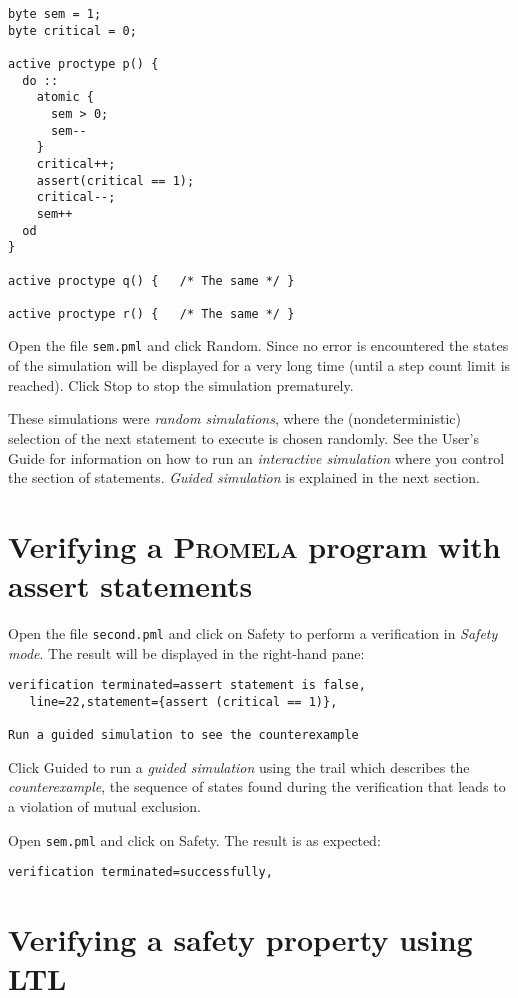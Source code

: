 \documentclass[11pt]{article}
\newcommand*{\prm}{\textsc{Promela}}
\newcommand*{\p}[1]{\texttt{#1}}
\newcommand*{\bu}[1]{\textsf{#1}}
\begin{document}
\pagebreak[4]

\begin{verbatim}
byte sem = 1;
byte critical = 0;

active proctype p() {	
  do :: 
    atomic {
      sem > 0;
      sem--
    }
    critical++;
    assert(critical == 1);
    critical--;
    sem++
  od
}

active proctype q() {	/* The same */ }

active proctype r() {	/* The same */ }	
\end{verbatim}

Open the file \p{sem.pml} and click \bu{Random}. Since no error is
encountered the states of the simulation will be displayed for a very
long time (until a step count limit is reached). Click \bu{Stop} to stop
the simulation prematurely.

These simulations were \emph{random simulations}, where the
(nondeterministic) selection of the next statement to execute is chosen
randomly. See the User's Guide for information on how to run an
\emph{interactive simulation} where you control the section of
statements. \emph{Guided simulation} is explained in the next section.

\section{Verifying a \prm{} program with assert statements}

Open the file \p{second.pml} and click on \bu{Safety} to perform a
verification in \emph{Safety mode}. The result will be displayed in the
right-hand pane:
\begin{verbatim}
verification terminated=assert statement is false,
   line=22,statement={assert (critical == 1)},

Run a guided simulation to see the counterexample
\end{verbatim}

Click \bu{Guided} to run a \emph{guided simulation} using the trail
which describes the \emph{counterexample}, the sequence of states found
during the verification that leads to a violation of mutual exclusion.

Open \p{sem.pml} and click on \bu{Safety}. The result is as expected:
\begin{verbatim}
verification terminated=successfully,
\end{verbatim}

\section{Verifying a safety property using LTL}
\end{document}
